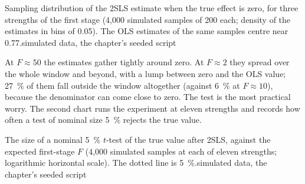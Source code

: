 \begin{omchart}{Sampling distribution of the 2SLS estimate when the true effect
is zero, for three strengths of the first stage (4{,}000 simulated samples of
200 each; density of the estimates in bins of 0.05). The OLS estimates of the
same samples centre near 0.77.}{simulated data, the chapter's seeded script}
\end{omchart}

At $F \approx 50$ the estimates gather tightly around zero. At $F \approx 2$
they spread over the whole window and beyond, with a lump between zero and the
OLS value; 27~\% of them fall outside the window altogether (against 6~\% at
$F \approx 10$), because the denominator can come close to zero. The test is the most practical worry. The second chart
runs the experiment at eleven strengths and records how often a test of
nominal size 5~\% rejects the true value.

\begin{omchart}{The size of a nominal 5~\% $t$-test of the true value after
2SLS, against the expected first-stage $F$ (4{,}000 simulated samples at each
of eleven strengths; logarithmic horizontal scale). The dotted line is
5~\%.}{simulated data, the chapter's seeded script}
\end{omchart}

